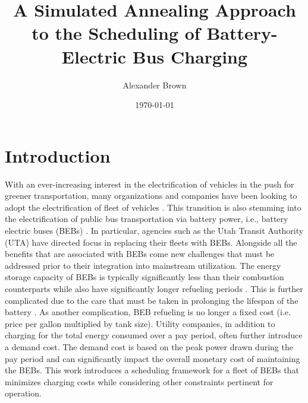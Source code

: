 \documentclass[energies,article,submit,moreauthors]{Definitions/mdpi}
\author{Alexander Brown}
\date{\today}
\title{A Simulated Annealing Approach to the Scheduling of Battery-Electric Bus Charging}
\begin{document}
\maketitle
\tableofcontents

\parskip 3mm                                %
\let\ref\autoref                            %

\renewcommand{\chapterautorefname}{Chapter}
\renewcommand{\sectionautorefname}{Section}
\renewcommand{\subsectionautorefname}{Section}
\renewcommand{\subsubsectionautorefname}{Section}
\renewcommand{\paragraphautorefname}{Section}
\renewcommand{\algorithmautorefname}{Algorithm}

\section{Introduction}
\label{sec:sa-introduction}
With an ever-increasing interest in the electrification of vehicles in the push for greener transportation, many
organizations and companies have been looking to adopt the electrification of fleet of vehicles \cite{khan-2022-inves}.
This transition is also stemming into the electrification of public bus transportation via battery power, i.e., battery
electric buses (BEBs) \cite{li-2016-batter-elect,guida-2017-zeeus-repor-europ}. In particular, agencies such as the
Utah Transit Authority (UTA) have directed focus in replacing their fleets with BEBs. Alongside all the benefits that
are associated with BEBs come new challenges that must be addressed prior to their integration into mainstream
utilization. The energy storage capacity of BEBs is typically significantly less than their combustion counterparts
while also have significantly longer refueling periods \cite{xylia-2018-role-charg,li-2016-batter-elect}. This is
further complicated due to the care that must be taken in prolonging the lifespan of the battery
\cite{lutsey-2019-updat-elect,edge-2021-lithium,millner-2010-model-lithium}. As another complication, BEB refueling
is no longer a fixed cost (i.e. price per gallon multiplied by tank size). Utility companies, in addition to charging
for the total energy consumed over a pay period, often further introduce a demand cost. The demand cost is based on the
peak power drawn during the pay period and can significantly impact the overall monetary cost of maintaining the BEBs.
This work introduces a scheduling framework for a fleet of BEBs that minimizes charging costs while considering other
constraints pertinent for operation.
\end{document}
